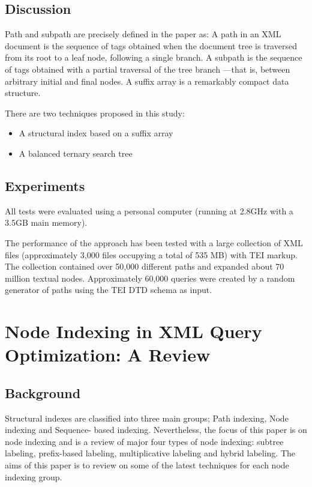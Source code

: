 \documentclass{paper}
\begin{document}
\subsection{Discussion}

Path and subpath are precisely defined in the paper as:  A path in an
XML document is the sequence of tags obtained when the document tree
is traversed from its root to a leaf node, following a single branch.
A subpath is the sequence of tags obtained with a partial traversal of
the tree branch —that is, between arbitrary initial and final nodes. A
suffix array is a remarkably compact data structure. 

There are two techniques proposed in this study:
\begin{itemize}
\item A structural index based on a suffix array
\item A balanced ternary search tree
\end{itemize}


\subsection{Experiments}

All tests were evaluated using a personal computer (running at 2.8GHz
with a 3.5GB main memory).

The performance of the approach has been tested with a large
collection of XML files (approximately 3,000 files occupying a total
of 535 MB) with TEI markup. The collection contained over 50,000
different paths and expanded about 70 million textual nodes.
Approximately 60,000 queries were created by a random generator of
paths using the TEI DTD schema as input. 

\section{Node Indexing in XML Query Optimization: A Review}

\subsection{Background}

Structural indexes are classified into three main  groups; Path indexing, Node
indexing and Sequence- based indexing. Nevertheless, the focus of this paper is
on node indexing and is a review of major four types of node indexing:
subtree labeling, prefix-based labeling, multiplicative labeling and hybrid
labeling. The aims of this paper is to review on some of the latest techniques
for each node indexing group.
\end{document}

